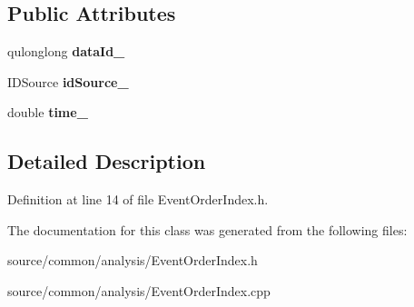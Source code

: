 \subsection*{Public Attributes}
\begin{DoxyCompactItemize}
\item 
\hypertarget{class_picto_1_1_event_order_index_a719b56a8298256fbf38004563d7946ee}{qulonglong {\bfseries data\-Id\-\_\-}}\label{class_picto_1_1_event_order_index_a719b56a8298256fbf38004563d7946ee}

\item 
\hypertarget{class_picto_1_1_event_order_index_aacfcf33b5cfc70f0b385c423f92a73f2}{I\-D\-Source {\bfseries id\-Source\-\_\-}}\label{class_picto_1_1_event_order_index_aacfcf33b5cfc70f0b385c423f92a73f2}

\item 
\hypertarget{class_picto_1_1_event_order_index_a31f70820e4668a388da27365504e375b}{double {\bfseries time\-\_\-}}\label{class_picto_1_1_event_order_index_a31f70820e4668a388da27365504e375b}

\end{DoxyCompactItemize}


\subsection{Detailed Description}


Definition at line 14 of file Event\-Order\-Index.\-h.



The documentation for this class was generated from the following files\-:\begin{DoxyCompactItemize}
\item 
source/common/analysis/Event\-Order\-Index.\-h\item 
source/common/analysis/Event\-Order\-Index.\-cpp\end{DoxyCompactItemize}
